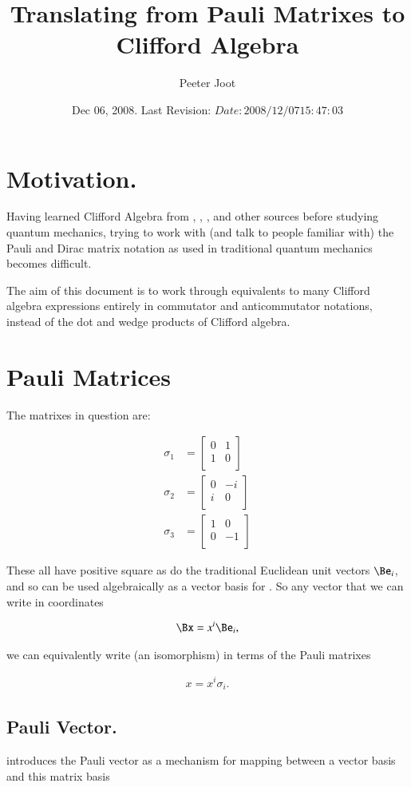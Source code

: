 \documentclass{article}
\title{Translating from Pauli Matrixes to Clifford Algebra}
\author{Peeter Joot}
\date{ Dec 06, 2008.  Last Revision: $Date: 2008/12/07 15:47:03 $ }
\newcommand{\PauliX}[0]{
\begin{bmatrix}
0 & 1 \\
1 & 0 \\
\end{bmatrix}
}
\newcommand{\PauliY}[0]{
\begin{bmatrix}
0 & -i \\
i & 0 \\
\end{bmatrix}
}
\newcommand{\PauliZ}[0]{
\begin{bmatrix}
1 & 0 \\
0 & -1 \\
\end{bmatrix}
}
\begin{document}
\maketitle{}

\tableofcontents

\section{ Motivation. }

Having learned Clifford Algebra from 
\cite{doran2003gap}, \cite{hestenes1999nfc}, \cite{dorst2007gac}, and other sources
before studying quantum mechanics, trying to work with (and talk to people familiar with) the Pauli and Dirac matrix notation as used in
traditional quantum mechanics becomes difficult.

The aim of this document is to work through equivalents to many Clifford algebra expressions entirely in
commutator and anticommutator notations, instead of the dot and wedge products of Clifford algebra.

\section{ Pauli Matrices }

The matrixes in question are:

\begin{align}
\sigma_1 &= \PauliX \\
\sigma_2 &= \PauliY \\
\sigma_3 &= \PauliZ
\end{align}

These all have positive square as do the traditional Euclidean unit vectors $\Be_i$, and so can be used algebraically as a vector basis for .  So any vector that we
can write in coordinates

\begin{align*}
\Bx = x^i \Be_i,
\end{align*}

we can equivalently write (an isomorphism) in terms of the Pauli matrixes

\begin{align}\label{eqn:vectorInPauliBasis}
x = x^i \sigma_i.
\end{align}

\subsection{ Pauli Vector. }
\cite{wikipauli} introduces the Pauli vector as a mechanism for mapping between a vector basis and this matrix basis
\end{document}
